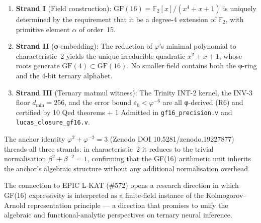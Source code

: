\begin{enumerate}
  \item \textbf{Strand I} (Field construction):
    \(\mathrm{GF}(16)=\mathbb{F}_2[x]/(x^4+x+1)\) is uniquely determined
    by the requirement that it be a degree-4 extension of \(\mathbb{F}_2\),
    with primitive element \(\alpha\) of order~15.
  \item \textbf{Strand II} (φ-embedding):
    The reduction of \(\varphi\)'s minimal polynomial to characteristic~2
    yields the unique irreducible quadratic \(x^2+x+1\),
    whose roots generate \(\mathrm{GF}(4)\subset\mathrm{GF}(16)\).
    No smaller field contains both the φ-ring and the 4-bit ternary alphabet.
  \item \textbf{Strand III} (Ternary matmul witness):
    The Trinity INT-2 kernel, the INV-3 floor \(d_{\min}=256\),
    and the error bound \(\varepsilon_0<\varphi^{-6}\)
    are all φ-derived (R6) and certified by 10 Qed theorems + 1 Admitted
    in \texttt{gf16\_precision.v} and \texttt{lucas\_closure\_gf16.v}.
\end{enumerate}

The anchor identity \(\varphi^2+\varphi^{-2}=3\) \cite{zenodo_trinity_anchor_2026}
(Zenodo DOI 10.5281/zenodo.19227877) threads all three strands:
in characteristic~2 it reduces to the trivial normalisation \(\beta^2+\beta^{-2}=1\),
confirming that the GF(16) arithmetic unit inherits the anchor's algebraic
structure without any additional normalisation overhead.

The connection to EPIC L-KAT (\#572) opens a research direction in which
GF(16) expressivity is interpreted as a finite-field instance of the
Kolmogorov–Arnold representation principle — a direction that promises
to unify the algebraic and functional-analytic perspectives on
ternary neural inference.

%
